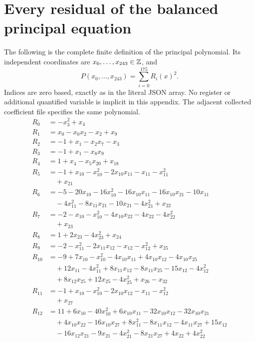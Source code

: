 \appendix
\section{Every residual of the balanced principal equation}
\label{sec:residuals}
The following is the complete finite definition of the principal polynomial.
Its independent coordinates are $x_0,\ldots,x_{243}\in\mathbb Z$, and
\[P(x_0,\ldots,x_{243})=\sum_{i=0}^{175}R_i(x)^2.\]
Indices are zero based, exactly as in the literal JSON array. No register
or additional quantified variable is implicit in this appendix. The
adjacent collected coefficient file specifies the same polynomial.
\begingroup\small\setlength{\jot}{1pt}\allowdisplaybreaks[4]
\begin{align*}
R_{0}&=-x_{3}^{2}+x_{4}\\
R_{1}&=x_{0}-x_{0}x_{2}-x_{2}+x_{9}\\
R_{2}&=-1+x_{1}-x_{2}x_{7}-x_{3}\\
R_{3}&=-1+x_{1}-x_{8}x_{9}\\
R_{4}&=1+x_{4}-x_{5}x_{20}+x_{18}\\
R_{5}&=-1+x_{10}-x_{10}^{2}-2x_{10}x_{11}-x_{11}-x_{11}^{2}\\
&\quad{}+x_{21}\\
R_{6}&=-5-20x_{10}-16x_{10}^{2}-16x_{10}x_{11}-16x_{10}x_{21}-10x_{11}\\
&\quad{}-4x_{11}^{2}-8x_{11}x_{21}-10x_{21}-4x_{21}^{2}+x_{22}\\
R_{7}&=-2-x_{10}-x_{10}^{2}-4x_{10}x_{22}-4x_{22}-4x_{22}^{2}\\
&\quad{}+x_{23}\\
R_{8}&=1+2x_{23}-4x_{23}^{2}+x_{24}\\
R_{9}&=-2-x_{11}^{2}-2x_{11}x_{12}-x_{12}-x_{12}^{2}+x_{25}\\
R_{10}&=-9+7x_{10}-x_{10}^{2}-4x_{10}x_{11}+4x_{10}x_{12}-4x_{10}x_{25}\\
&\quad{}+12x_{11}-4x_{11}^{2}+8x_{11}x_{12}-8x_{11}x_{25}-15x_{12}-4x_{12}^{2}\\
&\quad{}+8x_{12}x_{25}+12x_{25}-4x_{25}^{2}+x_{26}-x_{32}\\
R_{11}&=-1+x_{10}-x_{10}^{2}-2x_{10}x_{12}-x_{11}-x_{12}^{2}\\
&\quad{}+x_{27}\\
R_{12}&=11+6x_{10}-40x_{10}^{2}+6x_{10}x_{11}-32x_{10}x_{12}-32x_{10}x_{21}\\
&\quad{}+4x_{10}x_{22}-16x_{10}x_{27}+8x_{11}^{2}-8x_{11}x_{12}-4x_{11}x_{27}+15x_{12}\\
&\quad{}-16x_{12}x_{21}-9x_{21}-4x_{21}^{2}-8x_{21}x_{27}+4x_{22}+4x_{22}^{2}\\

\end{align*}

